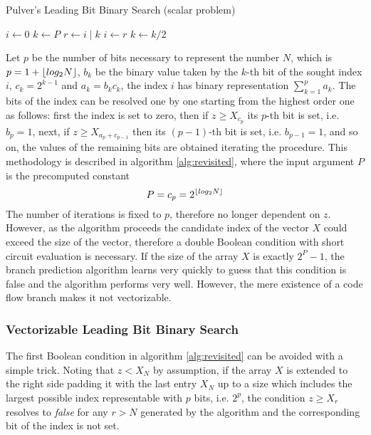 \documentclass[preprint,1p,times]{elsarticle}
\begin{document}
\begin{algorithm}[ht]
	\caption{Pulver's Leading Bit Binary Search (scalar problem)}
	\label{alg:revisited}
	\begin{algorithmic}
		 
		\State $i \leftarrow 0$
		\State $k \leftarrow P$
		\Repeat
		\State $r \leftarrow i\;|\;k$ 
		 
		\State $i \leftarrow r$
		\EndIf
		\State $k \leftarrow k / 2$ 
		\EndFunction
	\end{algorithmic}
\end{algorithm}

Let $p$ be the number of bits necessary to represent the number $N$, which is $p=1+\left \lfloor  log_2 N  \right \rfloor$,
    $b_k$ be the binary value taken by the $k$-th bit of the sought index $i$,
    $c_k = 2^{k-1}$
    and $a_k = b_kc_k$,
the index $i$ has binary representation $\sum_{k=1}^{p}a_k$.
The bits of the index can be resolved one by one starting from the highest order one as follows:
first the index is set to zero, then if $z \geq X_{c_p}$ its $p$-th bit is set, i.e. $b_p=1$,
next, if $z \geq X_{a_p+c_{p-1}}$ then its $(p-1)$-th bit is set, i.e. $b_{p-1}=1$, 
and so on, the values of the remaining bits are obtained iterating the procedure.
This methodology is described in algorithm \ref{alg:revisited}, where the input argument $P$ is the precomputed constant $$P=c_p=2^{\left \lfloor  log_2 N  \right \rfloor}$$
The number of iterations is fixed to $p$, therefore no longer dependent on $z$. However,
as the algorithm proceeds the candidate index of the vector $X$ could exceed the
size of the vector, therefore a double Boolean condition with short circuit evaluation is necessary. If the size of the array $X$ is exactly $2^P-1$, the branch prediction algorithm learns very quickly to guess that this condition is false and the algorithm performs very well. However, the mere existence of a code flow branch makes it not vectorizable.

\subsubsection{Vectorizable Leading Bit Binary Search}
\label{sec:leadbit}
The first Boolean condition in algorithm \ref{alg:revisited} can be avoided with a simple trick.
Noting that $z<X_N$ by assumption, if the array $X$ is extended to the right side padding 
it with the last entry $X_N$ up to a size which includes the largest possible index representable with $p$ bits, i.e. $2^p$, the condition $z \geq X_{r}$ resolves to \textit{false} for any $r>N$ generated by the algorithm and the corresponding bit of the index is not set.
\end{document}
